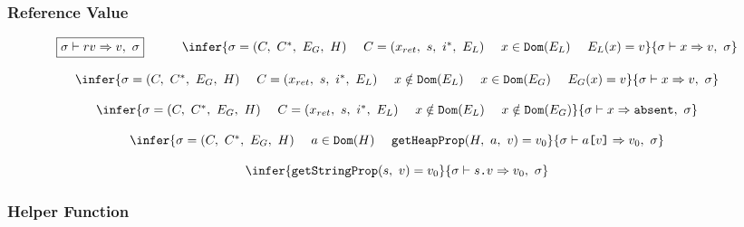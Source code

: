 \documentclass[11pt]{article}
\newcommand{\Term}[1]{\texttt{#1}}
\newcommand{\cs}[0]{\quad}
\newcommand{\symstate}[0]{\sigma}
\newcommand{\symctx}[0]{C}
\newcommand{\symctxstack}[0]{C^*}
\newcommand{\symenv}[0]{E}
\newcommand{\symheap}[0]{H}
\newcommand{\symrefv}[0]{rv}
\newcommand{\symstatetuple}[4]{(#1,\ #2,\ #3,\ #4)}
\newcommand{\symctxtuple}[4]{(#1,\ #2,\ #3,\ #4)}
\newcommand{\evalrefv}[4]{#1 \vdash #2 \Rightarrow #3,\ #4}
\newcommand{\hgethprop}[4]{\Term{getHeapProp}(#1,\ #2,\ #3) = #4}
\newcommand{\hgetsprop}[3]{\Term{getStringProp}(#1,\ #2) = #3}
\begin{document}
\subsubsection{Reference Value}
\[
\begin{array}{c}
\multicolumn{1}{c}{\begin{array}{ccc}
\fbox{$\evalrefv{\symstate}{\symrefv}{v}{\symstate}$}
& \cs &
\infer
{\symstate = \symstatetuple{\symctx}{\symctxstack}{\symenv_G}{\symheap} \ \ \ \
\symctx = \symctxtuple{x_{ret}}{s}{i^*}{\symenv_L}\ \ \ \
x \in \Term{Dom}(\symenv_L)\ \ \ \
\symenv_L (x) = v }
{\evalrefv{\symstate}{x}{v}{\symstate}}
\end{array}}
\\ \\
\infer
{\symstate = \symstatetuple{\symctx}{\symctxstack}{\symenv_G}{\symheap} \ \ \ \
\symctx = \symctxtuple{x_{ret}}{s}{i^*}{\symenv_L}\ \ \ \
x \notin \Term{Dom}(\symenv_L)\ \ \ \
x \in \Term{Dom}(\symenv_G)\ \ \ \
\symenv_G (x) = v }
{\evalrefv{\symstate}{x}{v}{\symstate}}
\\ \\
\infer
{\symstate = \symstatetuple{\symctx}{\symctxstack}{\symenv_G}{\symheap} \ \ \ \
\symctx = \symctxtuple{x_{ret}}{s}{i^*}{\symenv_L}\ \ \ \
x \notin \Term{Dom}(\symenv_L)\ \ \ \
x \notin \Term{Dom}(\symenv_G)}
{\evalrefv{\symstate}{x}{\Term{absent}}{\symstate}}
\\ \\
\infer
{\symstate = \symstatetuple{\symctx}{\symctxstack}{\symenv_G}{\symheap} \ \ \ \
a \in \Term{Dom}(\symheap)\ \ \ \
\hgethprop{\symheap}{a}{v}{v_0}}
{\evalrefv{\symstate}{a\Term{[} v \Term{]}}{v_0}{\symstate}}
\\ \\
\infer
{\hgetsprop{s}{v}{v_0}}
{\evalrefv{\symstate}{s\Term{.}v}{v_0}{\symstate}}

\end{array}
\]

\newpage

\subsubsection{Helper Function}
\end{document}
